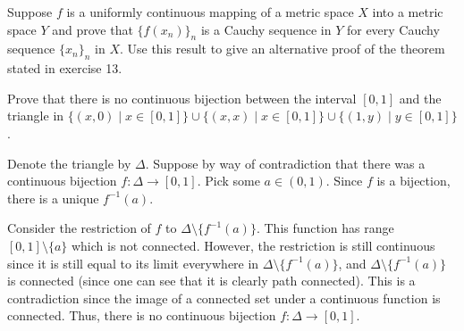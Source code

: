 \documentclass[12 pt, letterpaper]{hmcpset}
\begin{document}
\pagebreak

\begin{problem}
	Suppose $f$ is a uniformly continuous mapping of a metric space $X$ into a metric space $Y$ and prove that $\{ f(x_{n}) \}_{n}$ is a Cauchy sequence in $Y$ for every Cauchy sequence $\{ x_{n} \}_{n}$ in $X$. Use this result to give an alternative proof of the theorem stated in exercise 13.
\end{problem}

\pagebreak

\begin{problem}[Problem 6]
	Prove that there is no continuous bijection between the interval $[0, 1]$ and the triangle in $\{ (x, 0) \mid x \in [0, 1] \} \cup \{ (x, x) \mid x \in [0, 1] \} \cup \{ (1, y) \mid y \in [0, 1] \}$.
\end{problem}

\begin{solution}
	Denote the triangle by $\Delta$. Suppose by way of contradiction that there was a continuous bijection $f : \Delta \to [0, 1]$. Pick some $a \in (0, 1)$. Since $f$ is a bijection, there is a unique $f^{-1}(a)$.

	Consider the restriction of $f$ to $\Delta \setminus \{ f^{-1}(a) \}$. This function has range $[0, 1] \setminus \{ a \}$ which is not connected. However, the restriction is still continuous since it is still equal to its limit everywhere in $\Delta \setminus \{ f^{-1}(a) \}$, and $\Delta \setminus \{ f^{-1}(a) \}$ is connected (since one can see that it is clearly path connected). This is a contradiction since the image of a connected set under a continuous function is connected. Thus, there is no continuous bijection $f : \Delta \to [0, 1]$.
\end{solution}
\end{document}
